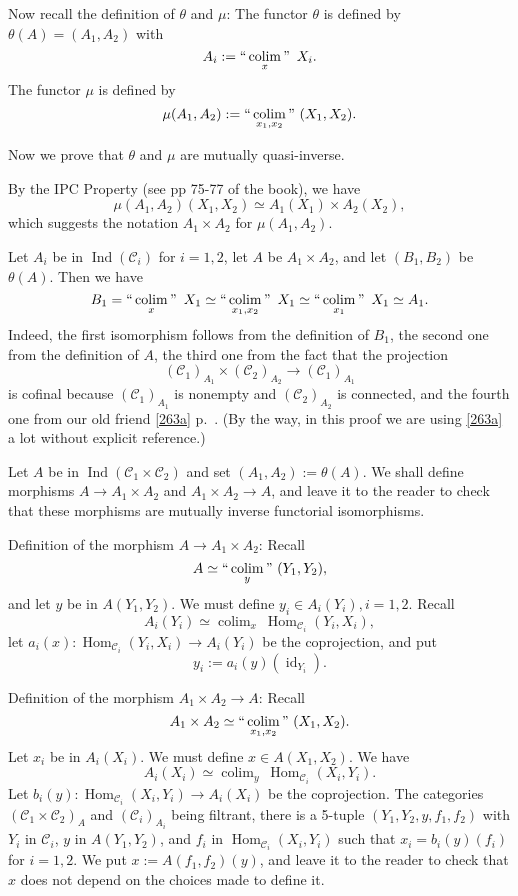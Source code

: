 \documentclass[12pt]{article}
\theoremstyle{remark}%
\newcommand{\C}{\mathcal C}
\DeclareMathOperator*{\coli}{colim}
\DeclareMathOperator*{\co}{colim}
\DeclareMathOperator*{\ic}{``\coli"}
\DeclareMathOperator{\id}{id}
\DeclareMathOperator{\h}{Hom}
\DeclareMathOperator{\Ind}{Ind}
\begin{document}
Now recall the definition of $\theta$ and $\mu$: The functor $\theta$ is defined by $\theta(A)=(A_1,A_2)$ with 
$$
A_i:=\ic_x\ X_i. 
$$ 
The functor $\mu$ is defined by 
$$
\mu(A_1,A_2):=\ic_{x_1,x_2}\ (X_1,X_2). 
$$ 

Now we prove that $\theta$ and $\mu$ are mutually quasi-inverse. 

By the IPC Property (see pp 75-77 of the book), we have 
$$
\mu(A_1,A_2)(X_1,X_2)\simeq A_1(X_1)\times A_2(X_2), 
$$ 
which suggests the notation $A_1\times A_2$ for $\mu(A_1,A_2)$. 

Let $A_i$ be in $\Ind(\C_i)$ for $i=1,2$, let $A$ be $A_1\times A_2$, and let $(B_1,B_2)$ be $\theta(A)$. Then we have 
$$ 
B_1=\ic_x\ X_1\simeq\ic_{x_1,x_2}\ X_1\simeq\ic_{x_1}\ X_1\simeq A_1.
$$ 
Indeed, the first isomorphism follows from the definition of $B_1$, the second one from the definition of $A$, the third one from the fact that the projection 
$$
(\C_1)_{A_1}\times (\C_2)_{A_2}\to(\C_1)_{A_1}
$$ 
is cofinal because $(\C_1)_{A_1}$ is nonempty and $(\C_2)_{A_2}$ is connected, and the fourth one from our old friend \eqref{263a} p.~\pageref{263a}. (By the way, in this proof we are using \eqref{263a} a lot without explicit reference.) 

Let $A$ be in $\Ind(\C_1\times\C_2)$ and set $(A_1,A_2):=\theta(A)$. We shall define morphisms $A\to A_1\times A_2$ and $A_1\times A_2\to A$, and leave it to the reader to check that these morphisms are mutually inverse functorial isomorphisms. 

Definition of the morphism $A\to A_1\times A_2$: Recall 
$$
A\simeq\ic_y\ (Y_1,Y_2), 
$$ 
and let $y$ be in $A(Y_1,Y_2)$. We must define $y_i\in A_i(Y_i),i=1,2$. Recall 
$$
A_i(Y_i)\simeq\co_x\ \h_{\C_i}(Y_i,X_i), 
$$ 
let $a_i(x):\h_{\C_i}(Y_i,X_i)\to A_i(Y_i)$ be the coprojection, and put 
$$
y_i:=a_i(y)(\id_{Y_i}). 
$$ 

Definition of the morphism $A_1\times A_2\to A$: Recall 
$$
A_1\times A_2\simeq\ic_{x_1,x_2}\ (X_1,X_2). 
$$ 
Let $x_i$ be in $A_i(X_i)$. We must define $x\in A(X_1,X_2)$. We have 
$$
A_i(X_i)\simeq\co_y\ \h_{\C_i}(X_i,Y_i). 
$$ 
Let $b_i(y):\h_{\C_i}(X_i,Y_i)\to A_i(X_i)$ be the coprojection. The categories $(\C_1\times\C_2)_A$ and $(\C_i)_{A_i}$ being filtrant, there is a 5-tuple $(Y_1,Y_2,y,f_1,f_2)$ with $Y_i$ in $\C_i$, $y$ in $A(Y_1,Y_2)$, and $f_i$ in $\h_{\C_i}(X_i,Y_i)$ such that $x_i=b_i(y)(f_i)$ for $i=1,2$. We put $x:=A(f_1,f_2)(y)$, and leave it to the reader to check that $x$ does not depend on the choices made to define it. 
%
\end{document}
